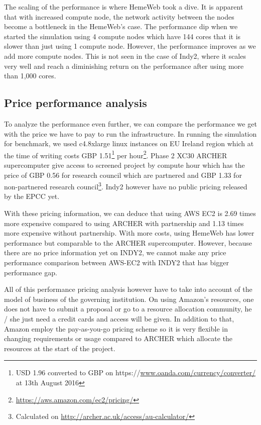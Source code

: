 The scaling of the performance is where HemeWeb took a dive. It is apparent that with increased compute node, the network activity between the nodes become a bottleneck in the HemeWeb's case. The performance dip when we started the simulation using 4 compute nodes which have 144 cores that it is slower than just using 1 compute node. However, the performance improves as we add more compute nodes. This is not seen in the case of Indy2, where it scales very well and reach a diminishing return on the performance after using more than 1,000 cores.

\subsection{Price performance analysis}

To analyze the performance even further, we can compare the performance we get with the price we have to pay to run the infrastructure. In running the simulation for benchmark, we used c4.8xlarge linux instances on EU Ireland region which at the time of writing costs GBP 1.51\footnote{USD 1.96 converted to GBP on https://\url{www.oanda.com/currency/converter/} at 13th August 2016} per hour\footnote{\url{https://aws.amazon.com/ec2/pricing/}}. Phase 2 XC30 ARCHER supercomputer give access to screened project by compute hour which has the price of GBP 0.56 for research council which are partnered and GBP 1.33 for  non-partnered research council\footnote{Calculated on \url{http://archer.ac.uk/access/au-calculator/}}. Indy2 however have no public pricing released by the EPCC yet.

With these pricing information, we can deduce that using AWS EC2 is 2.69 times more expensive compared to using ARCHER with partnership and 1.13 times more expensive without partnership. With more costs, using HemeWeb has lower performance but comparable to the ARCHER supercomputer.  However, because there are no price information yet on INDY2, we cannot make any price performance comparison between AWS-EC2 with INDY2 that has bigger performance gap.

All of this performance pricing analysis however have to take into account of the model of business of the governing institution. On using Amazon's resources, one does not have to submit a proposal or go to a resource allocation community, he / she just need a credit cards and access will be given. In addition to that, Amazon employ the pay-as-you-go pricing scheme so it is very flexible in changing requirements or usage compared to ARCHER which allocate the resources at the start of the project. 


